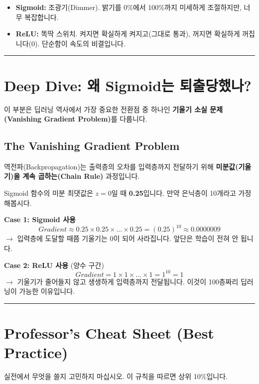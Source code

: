 \documentclass[11pt,a4paper]{book}
\theoremstyle{definition}
\begin{document}
\begin{analogybox}[title={전등 스위치 비유}]
\begin{itemize}
    \item \textbf{Sigmoid:} 조광기(Dimmer). 밝기를 0\%에서 100\%까지 미세하게 조절하지만, 너무 복잡합니다.
    \item \textbf{ReLU:} 똑딱 스위치. 켜지면 확실하게 켜지고(그대로 통과), 꺼지면 확실하게 꺼집니다(0). 단순함이 속도의 비결입니다.
\end{itemize}
\end{analogybox}

\vspace{0.5cm}\hrule\vspace{0.5cm}

\section{Deep Dive: 왜 Sigmoid는 퇴출당했나?}

이 부분은 딥러닝 역사에서 가장 중요한 전환점 중 하나인 \textbf{기울기 소실 문제(Vanishing Gradient Problem)}를 다룹니다.

\subsection{The Vanishing Gradient Problem}
역전파(Backpropagation)는 출력층의 오차를 입력층까지 전달하기 위해 \textbf{미분값(기울기)을 계속 곱하는(Chain Rule)} 과정입니다.

\begin{examplebox}[title={수학적 증명: $0.25$ vs $1.0$}]
Sigmoid 함수의 미분 최댓값은 $z=0$일 때 \textbf{0.25}입니다.
만약 은닉층이 10개라고 가정해봅시다.

\textbf{Case 1: Sigmoid 사용}
$$ Gradient \approx 0.25 \times 0.25 \times \dots \times 0.25 = (0.25)^{10} \approx 0.0000009 $$
$\rightarrow$ 입력층에 도달할 때쯤 기울기는 0이 되어 사라집니다. 앞단은 학습이 전혀 안 됩니다.

\textbf{Case 2: ReLU 사용} (양수 구간)
$$ Gradient = 1 \times 1 \times \dots \times 1 = 1^{10} = 1 $$
$\rightarrow$ 기울기가 줄어들지 않고 생생하게 입력층까지 전달됩니다. 이것이 100층짜리 딥러닝이 가능한 이유입니다.
\end{examplebox}

\vspace{0.5cm}\hrule\vspace{0.5cm}

\section{Professor's Cheat Sheet (Best Practice)}
실전에서 무엇을 쓸지 고민하지 마십시오. 이 규칙을 따르면 상위 10\%입니다.
\end{document}
